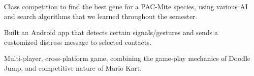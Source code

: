 \documentclass[letterpaper]{deedy-resume} %
\begin{document}
\begin{minipage}[t]{0.66\textwidth}
\sectionspace %



Class competition to find the best gene for a PAC-Mite species, using various AI and search algorithms that we learned throughout the semester.

\sectionspace %



Built an Android app that detects certain signals/gestures and sends a customized distress message to selected contacts.

\sectionspace %



Multi-player, cross-platform game, combining the game-play mechanics of Doodle Jump, and competitive nature of Mario Kart.

\sectionspace %

\end{minipage} %

\end{document}
